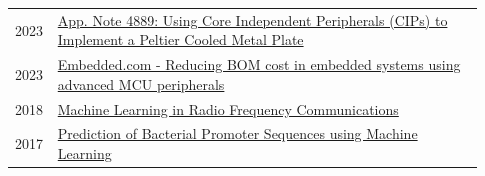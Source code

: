 \documentclass[
	10pt, %
]{FreemanCV}
\begin{document}
\begin{paracol}{2}
\begin{supertabular}{p{0.05\linewidth} p{0.88\linewidth}}
	2023 & \href{
	https://ww1.microchip.com/downloads/aemDocuments/documents/MCU08/ApplicationNotes/ApplicationNotes/AN4889-Using-CIPs-To-Implement-Peltier-Plate-DS00004889.pdf
	}{
	App. Note 4889: Using Core Independent Peripherals (CIPs) to Implement a Peltier Cooled Metal Plate
	\scriptsize\faLink} \\[5pt]
	2023 & \href{
	https://www.embedded.com/reducing-bom-cost-in-embedded-systems-using-advanced-mcu-peripherals/
	}{
	Embedded.com - Reducing BOM cost in embedded systems using advanced MCU peripherals
	\scriptsize\faLink} \\[5pt]
	2018 & \href{
	http://joshbooth.us/wp-content/uploads/2023/08/Machine-Learning-in-Radio-Frequency-Communications.pdf
	}{
	Machine Learning in Radio Frequency Communications
	\scriptsize\faLink} \\[5pt]
	2017 & \href{
	http://joshbooth.us/wp-content/uploads/2023/08/poster_SBME_promoter_predictions.pdf
	}{
	Prediction of Bacterial Promoter Sequences using Machine Learning
	\scriptsize\faLink} \\[5pt]
	
\end{supertabular}

\medskip %






\end{paracol}
\end{document}
